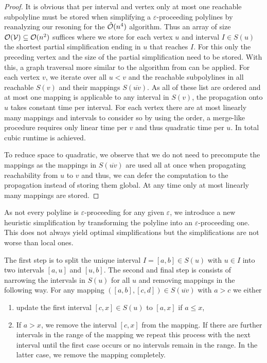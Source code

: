 \begin{proof}
	It is obvious that per interval and vertex only at most one reachable subpolyline must be stored when simplifying a \(\varepsilon\)-proceeding polylines by reanalyzing our resoning for the \(\hat{\mathcal{O}}(n^4)\) algorithm. Thus an array of size \(\mathcal{O}(\mathcal{V}) \subseteq \mathcal{O}(n^2)\) suffices where we store for each vertex \(u\) and interval \(I \in S(u)\) the shortest partial simplification ending in \(u\) that reaches \(I\). For this only the preceding vertex and the size of the partial simplification need to be stored. With this, a graph traversal more similar to the algorithm from \citeauthor{computational_geometric_methods_for_polygonal_approximations_of_a_curve} can be applied. For each vertex \(v\), we iterate over all \(u < v\) and the reachable subpolylines in all reachable \(S(v)\) and their mappings \(S(\overline{uv})\). As all of these list are ordered and at most one mapping is applicable to any interval in \(S(v)\), the propagation onto \(u\) takes constant time per interval. For each vertex there are at most linearly many mappings and intervals to consider so by using the order, a merge-like procedure requires only linear time per \(v\) and thus quadratic time per \(u\). In total cubic runtime is achieved. 

	To reduce space to quadratic, we observe that we do not need to precompute the mappings as the mappings in \(S(\overline{uv})\) are used all at once when propagating reachability from \(u\) to \(v\) and thus, we can defer the computation to the propagation instead of storing them global. At any time only at most linearly many mappings are stored.
\end{proof}

As not every polyline is \(\varepsilon\)-proceeding for any given \(\varepsilon\), we introduce a new heuristic simplification by transforming the polyline into an \(\varepsilon\)-proceeding one. This does not always yield optimal simplifications but the simplifications are not worse than local ones.

The first step is to split the unique interval \(I = [a, b] \in S(u)\) with \(u \in I\) into two intervals \([a, u]\) and \([u, b]\). The second and final step is consists of narrowing the intervals in \(S(u)\) for all \(u\) and removing mappings in the following way. For any mapping \(([a,b], [c,d]) \in S(\overline{uv})\) with \(a > c\) we either 
\begin{enumerate}
	\item update the first interval \([c, x] \in S(u)\) to \([a, x]\) if \(a \leq x\),
	\item If \(a > x\), we remove the interval \([c, x]\) from the mapping. If there are further intervals in the range of the mapping we repeat this process with the next interval until the first case occurs or no intervals remain in the range. In the latter case, we remove the mapping completely.
\end{enumerate}

